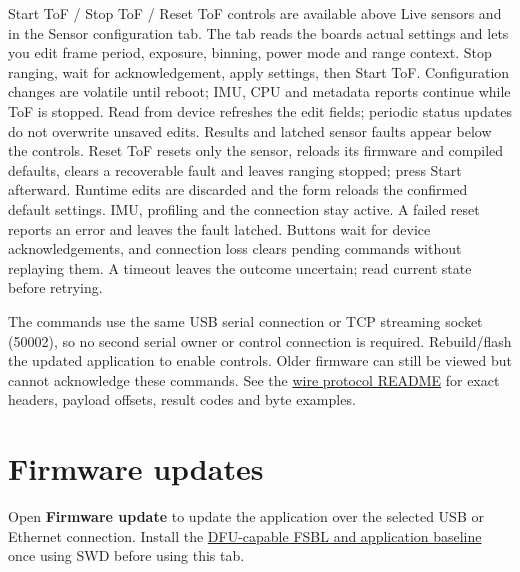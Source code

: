 \documentclass[10pt,a4paper,oneside]{report}
\begin{document}
Start ToF / Stop ToF / Reset ToF controls are available above Live sensors and in the Sensor configuration tab. The tab reads the board\textquotesingle s actual settings and lets you edit frame period, exposure, binning, power mode and range context. Stop ranging, wait for acknowledgement, apply settings, then Start ToF. Configuration changes are volatile until reboot; IMU, CPU and metadata reports continue while ToF is stopped. Read from device refreshes the edit fields; periodic status updates do not overwrite unsaved edits. Results and latched sensor faults appear below the controls. Reset ToF resets only the sensor, reloads its firmware and compiled defaults, clears a recoverable fault and leaves ranging stopped; press Start afterward. Runtime edits are discarded and the form reloads the confirmed default settings. IMU, profiling and the connection stay active. A failed reset reports an error and leaves the fault latched. Buttons wait for device acknowledgements, and connection loss clears pending commands without replaying them. A timeout leaves the outcome uncertain; read current state before retrying.

The commands use the same USB serial connection or TCP streaming socket (50002), so no second serial owner or control connection is required. Rebuild/flash the updated application to enable controls. Older firmware can still be viewed but cannot acknowledge these commands. See the \hyperref[wiki-protocols-wire-protocol--magnecko-sense-wire-protocol]{wire protocol README} for exact headers, payload offsets, result codes and byte examples.

\section{Firmware updates}\label{wiki-tools-device-monitor--firmware-updates}

Open \textbf{Firmware update} to update the application over the selected USB or Ethernet connection. Install the \hyperref[wiki-firmware-firmware-updates--first-installation]{DFU-capable FSBL and application baseline} once using SWD before using this tab.
\end{document}
